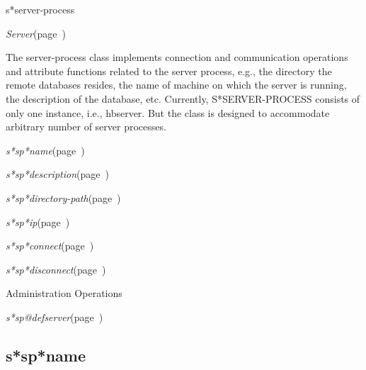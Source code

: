\begin{description}
\item [Name:]  s*server-process

\item [Layer:] {\sl Server}\hfill(page~\pageref{Server})

\item [Description:]
The server-process class implements connection and
communication operations and attribute functions
related  to the server process, e.g., the directory the
remote databases resides, the name of machine on which
the server is running, the description of the database,
etc. Currently, S*SERVER-PROCESS consists of only one
instance, i.e., hbserver. But the class is designed to
accommodate arbitrary number of server processes. 

\item [Attributes:]
\item {\sl s*sp*name}\hfill(page~\pageref{s*sp*name})
\item {\sl s*sp*description}\hfill(page~\pageref{s*sp*description})
\item {\sl s*sp*directory-path}\hfill(page~\pageref{s*sp*directory-path})
\item {\sl s*sp*ip}\hfill(page~\pageref{s*sp*ip})

\item [Operations:]
\item {\sl s*sp*connect}\hfill(page~\pageref{s*sp*connect})
\item {\sl s*sp*disconnect}\hfill(page~\pageref{s*sp*disconnect})

Administration Operations
\item {\sl s*sp@defserver}\hfill(page~\pageref{s*sp@defserver})

\item [Collections:]

\item [Subclasses:]

\item [Superclasses:]



\end{description}
\horizontalline

\subsection{s*sp*name}
\label{s*sp*name}

